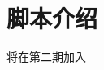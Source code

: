\documentclass[../main.tex]{subfiles}
\begin{document}
\chapter{脚本介绍}
\vspace{-2cm}

将在第二期加入
\end{document}
